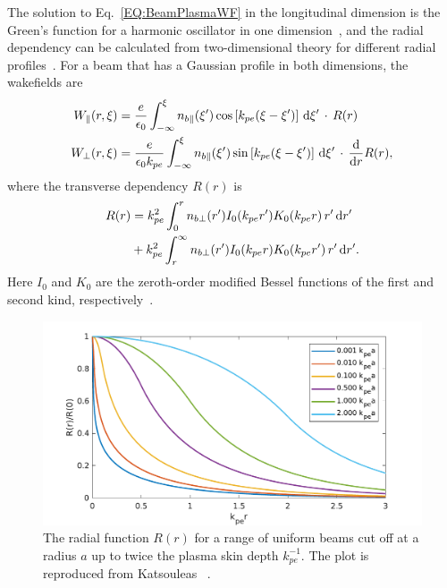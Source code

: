 The solution to Eq.~\ref{EQ:BeamPlasmaWF} in the longitudinal dimension is the Green’s function for a harmonic oscillator in one dimension~\cite{katsouleas:1987}, and the radial dependency can be calculated from two-dimensional theory for different radial profiles~\cite{chen:1987}.
For a beam that has a Gaussian profile in both dimensions, the wakefields are
\begin{align}
    W_{\parallel}(r,\xi) &= \frac{e}{\epsilon_{0}}
        \int_{-\infty}^{\xi} n_{b\parallel}(\xi^{\prime}) \cos\left[k_{pe}(\xi-\xi^{\prime})\right] \,\mathrm{d}\xi^{\prime} \,\cdot\, R(r) \label{EQ:WzFull} \\
    W_{\perp}(r,\xi) &= \frac{e}{\epsilon_{0}k_{pe}}
        \int_{-\infty}^{\xi} n_{b\parallel}(\xi^{\prime}) \sin\left[k_{pe}(\xi-\xi^{\prime})\right] \,\mathrm{d}\xi^{\prime} \,\cdot\, \frac{\mathrm{d}}{\mathrm{d}r}R(r), \label{EQ:WrFull}
\end{align}
where the transverse dependency $R(r)$ is
\begin{align}
    R(r) &= k_{pe}^{2} \int_{0}^{r} n_{b\perp}(r^{\prime}) I_{0}(k_{pe}r^{\prime})
           K_{0}(k_{pe}r) \,r^{\prime}\,\mathrm{d} r^{\prime} \nonumber \\
         &+ k_{pe}^{2} \int_{r}^{\infty} n_{b\perp}(r^{\prime}) I_{0}(k_{pe}r)
           K_{0}(k_{pe}r^{\prime}) \,r^{\prime}\,\mathrm{d} r^{\prime}. \label{EQ:WFRadial}
\end{align}
Here $I_{0}$ and $K_{0}$ are the zeroth-order modified Bessel functions of the first and second kind, respectively~\cite{chen:1987,muggli:2017}.

\begin{figure}[hbt]
    \centering
    \includegraphics[width=0.8125\linewidth,trim={0mm 0mm 0mm 0mm},clip]{figures/RepKatsouleas1987}
    \caption{\label{Fig:BPI:Kat87}
        The radial function $R(r)$ for a range of uniform beams cut off at a radius $a$ up to twice the plasma skin depth $k_{pe}^{-1}$.
        The plot is reproduced from Katsouleas \etal~\cite{katsouleas:1987}.
    }
\end{figure}

